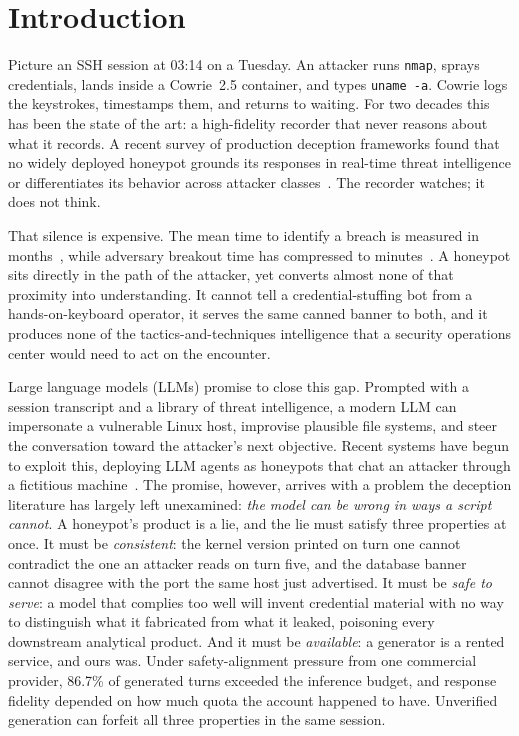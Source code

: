 \section{Introduction}
\label{sec:intro}

Picture an SSH session at 03:14 on a Tuesday. An attacker runs
\texttt{nmap}, sprays credentials, lands inside a Cowrie~2.5 container, and
types \texttt{uname -a}. Cowrie logs the keystrokes, timestamps them, and
returns to waiting. For two decades this has been the state of the art: a
high-fidelity recorder that never reasons about what it records. A recent
survey of production deception frameworks found that no widely deployed
honeypot grounds its responses in real-time threat intelligence or
differentiates its behavior across attacker classes~\cite{lopez2024}. The
recorder watches; it does not think.

That silence is expensive. The mean time to identify a breach is measured in
months~\cite{ibm2024}, while adversary breakout time has compressed to
minutes~\cite{crowdstrike2026}. A honeypot sits directly in the path of the
attacker, yet converts almost none of that proximity into understanding. It
cannot tell a credential-stuffing bot from a hands-on-keyboard operator, it
serves the same canned banner to both, and it produces none of the
tactics-and-techniques intelligence that a security operations center would
need to act on the encounter.

Large language models (LLMs) promise to close this gap. Prompted with a
session transcript and a library of threat intelligence, a modern LLM can
impersonate a vulnerable Linux host, improvise plausible file systems, and
steer the conversation toward the attacker's next objective. Recent systems
have begun to exploit this, deploying LLM agents as honeypots that chat an
attacker through a fictitious machine~\cite{reworr2024}. The promise,
however, arrives with a problem the deception literature has largely left
unexamined: \emph{the model can be wrong in ways a script cannot}. A
honeypot's product is a lie, and the lie must satisfy three properties at
once. It must be \emph{consistent}: the kernel version printed on turn one
cannot contradict the one an attacker reads on turn five, and the database
banner cannot disagree with the port the same host just advertised. It
must be \emph{safe to serve}: a model that complies too well will invent
credential material with no way to distinguish what it fabricated from
what it leaked, poisoning every downstream analytical product. And it
must be \emph{available}: a generator is a rented service, and ours was.
Under safety-alignment pressure from one commercial provider, 86.7\% of
generated turns exceeded the inference budget, and response fidelity
depended on how much quota the account happened to have. Unverified
generation can forfeit all three properties in the same session.

